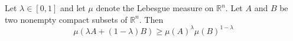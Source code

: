 \begin{theorem}
    Let \(\lambda \in [0, 1]\) and let \(\mu\) denote the Lebesgue measure on \(\mathbb{R}^n\). Let \(A\) and \(B\) be two nonempty compact subsets of \(\mathbb{R}^n\). Then
    \begin{equation*}
        \mu(\lambda A + (1 - \lambda) B) \ge \mu(A)^\lambda\mu(B)^{1-\lambda}
    \end{equation*}
\end{theorem}
